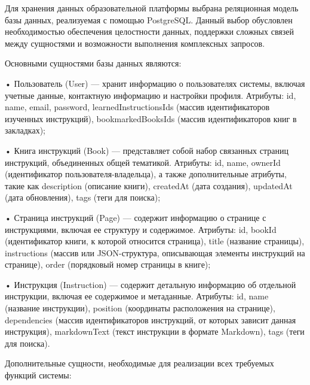 {\gostFont

  \par \redline Для хранения данных образовательной платформы выбрана реляционная модель базы данных, реализуемая с помощью PostgreSQL. Данный выбор обусловлен необходимостью обеспечения целостности данных, поддержки сложных связей между сущностями и возможности выполнения комплексных запросов.

  \par \redline Основными сущностями базы данных являются:

  \par \redline • Пользователь (User) — хранит информацию о пользователях системы, включая учетные данные, контактную информацию и настройки профиля. Атрибуты: id, name, email, password, learnedInstructionsIds (массив идентификаторов изученных инструкций), bookmarkedBooksIds (массив идентификаторов книг в закладках);
  \par \redline • Книга инструкций (Book) — представляет собой набор связанных страниц инструкций, объединенных общей тематикой. Атрибуты: id, name, ownerId (идентификатор пользователя-владельца), а также дополнительные атрибуты, такие как description (описание книги), createdAt (дата создания), updatedAt (дата обновления), tags (теги для поиска);
  \par \redline • Страница инструкций (Page) — содержит информацию о странице с инструкциями, включая ее структуру и содержимое. Атрибуты: id, bookId (идентификатор книги, к которой относится страница), title (название страницы), instructions (массив или JSON-структура, описывающая элементы инструкций на странице), order (порядковый номер страницы в книге);
  \par \redline • Инструкция (Instruction) — содержит детальную информацию об отдельной инструкции, включая ее содержимое и метаданные. Атрибуты: id, name (название инструкции), position (координаты расположения на странице), dependencies (массив идентификаторов инструкций, от которых зависит данная инструкция), markdownText (текст инструкции в формате Markdown), tags (теги для поиска).

  \par \redline Дополнительные сущности, необходимые для реализации всех требуемых функций системы:

}
